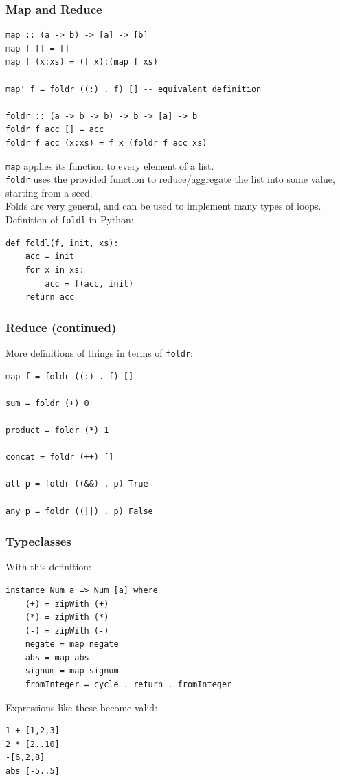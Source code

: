 \documentclass{beamer}
\begin{document}
\begin{frame}[fragile]
\frametitle{Map and Reduce}
\begin{Verbatim}[frame=single, fontsize=\scriptsize]
map :: (a -> b) -> [a] -> [b]
map f [] = []
map f (x:xs) = (f x):(map f xs)

map' f = foldr ((:) . f) [] -- equivalent definition

foldr :: (a -> b -> b) -> b -> [a] -> b
foldr f acc [] = acc
foldr f acc (x:xs) = f x (foldr f acc xs)
\end{Verbatim}
\verb|map| applies its function to every element of a list.\\
\verb|foldr| uses the provided function to reduce/aggregate the list into some value, starting from a seed.\\
Folds are very general, and can be used to implement many types of loops.\\
Definition of \verb|foldl| in Python:
\begin{Verbatim}[frame=single, fontsize=\scriptsize]
def foldl(f, init, xs):
    acc = init
    for x in xs:
        acc = f(acc, init)
    return acc
\end{Verbatim}
\end{frame}

\begin{frame}[fragile]
\frametitle{Reduce (continued)}
More definitions of things in terms of \verb|foldr|:
\begin{Verbatim}[frame=single, fontsize=\scriptsize]
map f = foldr ((:) . f) []

sum = foldr (+) 0

product = foldr (*) 1

concat = foldr (++) []

all p = foldr ((&&) . p) True

any p = foldr ((||) . p) False
\end{Verbatim}
\end{frame}

\begin{frame}[fragile]
\frametitle{Typeclasses}
With this definition:
\begin{Verbatim}[frame=single, fontsize=\scriptsize]
instance Num a => Num [a] where
    (+) = zipWith (+)
    (*) = zipWith (*)
    (-) = zipWith (-)
    negate = map negate
    abs = map abs
    signum = map signum
    fromInteger = cycle . return . fromInteger
\end{Verbatim}
Expressions like these become valid:
\begin{Verbatim}[frame=single, fontsize=\scriptsize]
1 + [1,2,3]
2 * [2..10]
-[6,2,8]
abs [-5..5]
\end{Verbatim}
\end{frame}
\end{document}
